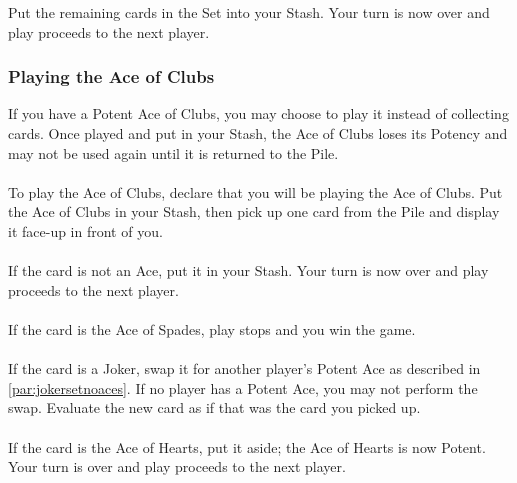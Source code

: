 \documentclass{article}
\begin{document}
Put the remaining cards in the Set into your Stash. Your turn is now
over and play proceeds to the next player.

\subsubsection{Playing the Ace of Clubs \label{sec:playac}}

If you have a Potent Ace of Clubs, you may choose to play it instead of
collecting cards. Once played and put in your Stash, the Ace of Clubs
loses its Potency and may not be used again until it is returned to the
Pile.

\paragraph{\label{par:playclubs}}
To play the Ace of Clubs, declare that you will be playing the Ace of
Clubs. Put the Ace of Clubs in your Stash, then pick up one card from
the Pile and display it face-up in front of you.

\paragraph{\label{par:playclubsregular}}
If the card is not an Ace, put it in your Stash. Your turn is now over
and play proceeds to the next player.

\paragraph{\label{par:playclubsspades}}
If the card is the Ace of Spades, play stops and you win the game.

\paragraph{\label{par:playclubsjoker}}
If the card is a Joker, swap it for another player's Potent Ace as
described in \autoref{par:jokersetnoaces}. If no player has a Potent Ace,
you may not perform the swap. Evaluate the new card as if that was the
card you picked up.

\paragraph{\label{par:playclubshearts}}
If the card is the Ace of Hearts, put it aside; the Ace of Hearts is now
Potent. Your turn is over and play proceeds to the next player.
\end{document}

